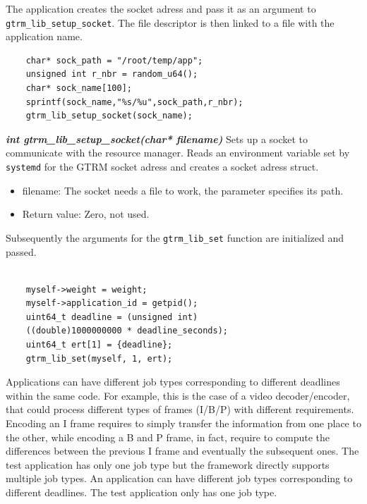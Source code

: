 \documentclass[nobiblatex]{LTHthesis}
\begin{document}
The application creates the socket adress and pass it as an argument to 
\texttt{gtrm\_lib\_setup\_socket}. The file descriptor is then linked to
a file with the application name.
\begin{lstlisting}
	char* sock_path = "/root/temp/app";
	unsigned int r_nbr = random_u64();
	char* sock_name[100];
	sprintf(sock_name,"%s/%u",sock_path,r_nbr);
	gtrm_lib_setup_socket(sock_name);
\end{lstlisting}

\begin{framed}
	\begin{flushleft}		
		\emph{\textbf{{int gtrm\_lib\_setup\_socket(char* filename)}}}
		Sets up a socket to communicate with the resource manager. 
    Reads an environment variable set by \texttt{systemd} for the GTRM
    socket adress and creates a socket adress struct.
		\begin{itemize}
		\item filename: The socket needs a file to work, the parameter 
      specifies its path.
		\item Return value: Zero, not used.
		\end{itemize}
	\end{flushleft}
\end{framed}

Subsequently the arguments for the \texttt{gtrm\_lib\_set} function
are initialized and passed.
\begin{lstlisting}	

	myself->weight = weight;
	myself->application_id = getpid();
	uint64_t deadline = (unsigned int) 
    ((double)1000000000 * deadline_seconds);
	uint64_t ert[1] = {deadline};
	gtrm_lib_set(myself, 1, ert);
\end{lstlisting}
Applications can have different job types corresponding to different 
deadlines within the same code. For example, this is the case of a video
decoder/encoder, that could process different types of frames (I/B/P)
with different requirements. Encoding an I frame requires to simply
transfer the information from one place to the other, while encoding a B and
P frame, in fact, require to compute the differences between the previous
I frame and eventually the subsequent ones. The test application has 
only one job type but the framework directly supports multiple job types. 
An application can have different job types corresponding to different deadlines. The test application only has one job type. 
\end{document}
